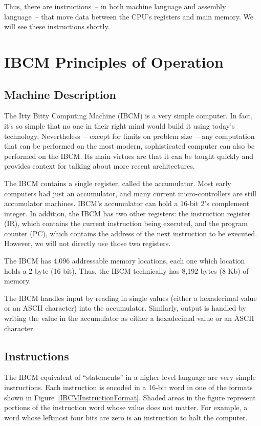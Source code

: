Thus, there are instructions~-- in both machine language and assembly
language~-- that move data between the CPU's registers and main memory.
We will see these instructions shortly.



\section{IBCM Principles of Operation}

\subsection{Machine Description}

The Itty Bitty Computing Machine (IBCM) is a very simple computer.  In
fact, it's so simple that no one in their right mind would build it
using today's technology. Nevertheless~-- except for limits on problem
size~-- any computation that can be performed on the most modern,
sophisticated computer can also be performed on the IBCM.  Its main
virtues are that it can be taught quickly and provides context for
talking about more recent architectures.

The IBCM contains a single register, called the accumulator.  Most
early computers had just an accumulator, and many current
micro-controllers are still accumulator machines.  IBCM's accumulator
can hold a 16-bit 2's complement integer.  In addition, the IBCM has
two other registers: the instruction register (IR), which contains the
current instruction being executed, and the program counter (PC),
which contains the address of the next instruction to be executed.
However, we will not directly use those two registers.

The IBCM has 4,096 addressable memory locations, each one which
location holds a 2 byte (16 bit).  Thus, the IBCM technically has
8,192 bytes (8 Kb) of memory.

The IBCM handles input by reading in single values (either a
hexadecimal value or an ASCII character) into the accumulator.
Similarly, output is handled by writing the value in the accumulator
as either a hexadecimal value or an ASCII character.

\subsection{Instructions}

The IBCM equivalent of ``statements'' in a higher level language are
very simple instructions.  Each instruction is encoded in a 16-bit
word in one of the formats shown in
Figure~\ref{IBCMInstructionFormat}.  Shaded areas in the figure
represent portions of the instruction word whose value does not
matter. For example, a word whose leftmost four bits are zero is an
instruction to halt the computer.


